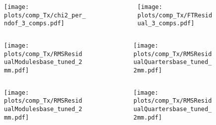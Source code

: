 \documentclass[aspectratio=1610, 12pt]{beamer}
\begin{document}
\begin{frame}
  \begin{columns}
    \begin{column}[c]{0.48\textwidth}
      \begin{figure}
        \texttt{[image: plots/comp\_Tx/chi2\_per\_ndof\_3\_comps.pdf]}
      \end{figure}
    \end{column}
    \begin{column}[c]{0.48\textwidth}
      \begin{figure}
        \texttt{[image: plots/comp\_Tx/FTResidual\_3\_comps.pdf]}
      \end{figure}
    \end{column}
  \end{columns}
\end{frame}

\begin{frame}
  \begin{columns}
    \begin{column}[c]{0.48\textwidth}
      \begin{figure}
        \texttt{[image: plots/comp\_Tx/RMSResidualModulesbase\_tuned\_2mm.pdf]}
      \end{figure}
    \end{column}
    \begin{column}[c]{0.48\textwidth}
      \begin{figure}
        \texttt{[image: plots/comp\_Tx/RMSResidualQuartersbase\_tuned\_2mm.pdf]}
      \end{figure}
    \end{column}
  \end{columns}
\end{frame}

\begin{frame}
  \begin{columns}
    \begin{column}[c]{0.48\textwidth}
      \begin{figure}
        \texttt{[image: plots/comp\_Tx/RMSResidualModulesbase\_tuned\_2mm.pdf]}
      \end{figure}
    \end{column}
    \begin{column}[c]{0.48\textwidth}
      \begin{figure}
        \texttt{[image: plots/comp\_Tx/RMSResidualQuartersbase\_tuned\_2mm.pdf]}
      \end{figure}
    \end{column}
  \end{columns}
\end{frame}
\end{document}
